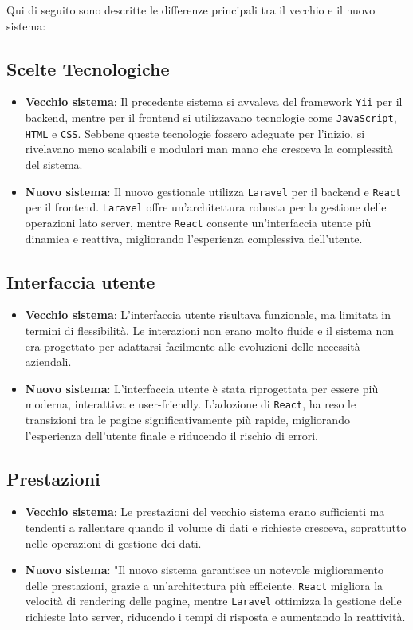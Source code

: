 Qui di seguito sono descritte le differenze principali tra il vecchio e il nuovo sistema:
\subsection{Scelte Tecnologiche}
\begin{itemize}
    \item \textbf{Vecchio sistema}: Il precedente sistema si avvaleva del framework \texttt{Yii} per il backend, mentre per il frontend si utilizzavano tecnologie come \texttt{JavaScript}, \texttt{HTML} e \texttt{CSS}.
    Sebbene queste tecnologie fossero adeguate per l'inizio, si rivelavano meno scalabili e modulari man mano che cresceva la complessità del sistema.
    \item \textbf{Nuovo sistema}: Il nuovo gestionale utilizza \texttt{Laravel} per il backend e \texttt{React} per il frontend. \texttt{Laravel} offre un'architettura robusta per la gestione delle operazioni lato server, mentre \texttt{React} consente un'interfaccia utente più dinamica e reattiva, migliorando l'esperienza complessiva dell'utente.
\end{itemize}

\subsection{Interfaccia utente}

\begin{itemize}
    \item \textbf{Vecchio sistema}: L’interfaccia utente risultava funzionale, ma limitata in termini di flessibilità. Le interazioni non erano molto fluide e il sistema non era progettato per adattarsi facilmente alle evoluzioni delle necessità aziendali.
    \item \textbf{Nuovo sistema}: L'interfaccia utente è stata riprogettata per essere più moderna, interattiva e user-friendly. L'adozione di \texttt{React}, ha reso le transizioni tra le pagine significativamente più rapide, migliorando l'esperienza dell'utente finale e riducendo il rischio di errori.
\end{itemize}

\subsection{Prestazioni}

\begin{itemize}
    \item \textbf{Vecchio sistema}: Le prestazioni del vecchio sistema erano sufficienti ma tendenti a rallentare quando il volume di dati e richieste cresceva, soprattutto nelle operazioni di gestione dei dati.
    \item \textbf{Nuovo sistema}: "Il nuovo sistema garantisce un notevole miglioramento delle prestazioni, grazie a un'architettura più efficiente.
    \texttt{React} migliora la velocità di rendering delle pagine, mentre \texttt{Laravel} ottimizza la gestione delle richieste lato server, riducendo i tempi di risposta e aumentando la reattività.
\end{itemize}

